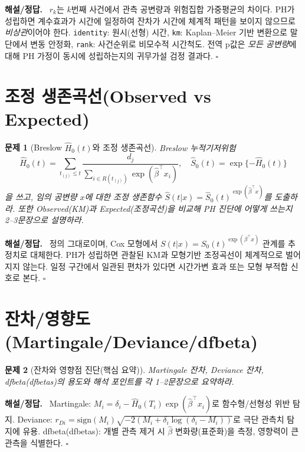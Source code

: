 \documentclass[12pt]{article}
\theoremstyle{myplain}
\newtheorem{problem}{문제}
\newenvironment{solution}{%
  \par\noindent\textbf{해설/정답.}\ }{\hfill$\square$\par}
\begin{document}
\begin{solution}
$r_k$는 $k$번째 사건에서 관측 공변량과 위험집합 가중평균의 차이다.
PH가 성립하면 계수효과가 시간에 일정하여 잔차가 시간에 체계적 패턴을 보이지 않으므로 \emph{비상관}이어야 한다.
\texttt{identity}: 원시(선형) 시간, \texttt{km}: Kaplan--Meier 기반 변환으로 말단에서 변동 안정화, \texttt{rank}: 사건순위로 비모수적 시간척도.
전역 p값은 \emph{모든 공변량}에 대해 PH 가정이 동시에 성립하는지의 귀무가설 검정 결과다.
\end{solution}

\section{조정 생존곡선(Observed vs Expected)}

\begin{problem}[Breslow $\hat H_0(t)$와 조정 생존곡선]
Breslow 누적기저위험
\[
\hat H_0(t)=\sum_{t_{(j)}\le t}\frac{d_j}{\sum_{i\in R(t_{(j)})}\exp(\hat\beta^\top x_i)},
\quad \hat S_0(t)=\exp\{-\hat H_0(t)\}
\]
을 쓰고, 임의 공변량 $x$에 대한 조정 생존함수 $\hat S(t|x)=\hat S_0(t)^{\exp(\hat\beta^\top x)}$를 도출하라.
또한 \emph{Observed(KM)}과 \emph{Expected(조정곡선)}을 비교해 PH 진단에 어떻게 쓰는지 2--3문장으로 설명하라.
\end{problem}

\begin{solution}
정의 그대로이며, Cox 모형에서 $S(t|x)=S_0(t)^{\exp(\beta^\top x)}$ 관계를 추정치로 대체한다.
PH가 성립하면 관찰된 KM과 모형기반 조정곡선이 체계적으로 벌어지지 않는다.
일정 구간에서 일관된 편차가 있다면 시간가변 효과 또는 모형 부적합 신호로 본다.
\end{solution}

\section{잔차/영향도 (Martingale/Deviance/dfbeta)}

\begin{problem}[잔차와 영향점 진단(핵심 요약)]
Martingale 잔차, Deviance 잔차, dfbeta(dfbetas)의 용도와 해석 포인트를 각 1--2문장으로 요약하라.
\end{problem}

\begin{solution}
Martingale: $M_i=\delta_i-\hat H_0(T_i)\exp(\hat\beta^\top x_i)$로 함수형/선형성 위반 탐지.
Deviance: $r_{Di}=\mathrm{sign}(M_i)\sqrt{-2(M_i+\delta_i\log(\delta_i-M_i))}$로 극단 관측치 탐지에 유용.
dfbeta(dfbetas): 개별 관측 제거 시 $\hat\beta$ 변화량(표준화)을 측정, 영향력이 큰 관측을 식별한다.
\end{solution}
\end{document}
